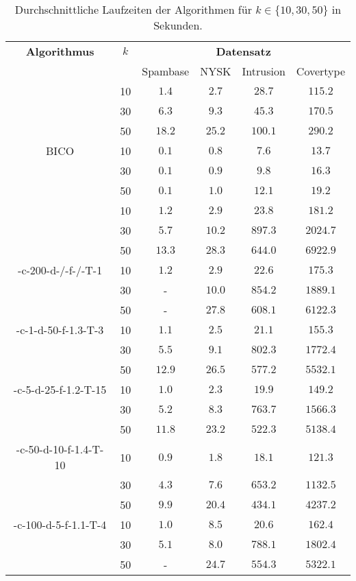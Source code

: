 \begin{table}[h]
\centering
\begin{tabular}{@{}cccccc@{}} \toprule
	\textbf{Algorithmus} & $k$ & \multicolumn{4}{c}{\textbf{Datensatz}} \\
	\cmidrule(r){3-6} & 		& Spambase 				& NYSK 				& Intrusion 			& Covertype \\ \toprule
	\Skmpp 						& 10 & $1.4$ 			& $2.7$ 			& $28.7$ 				& $115.2$ \\
		 						& 30 & $6.3$ 			& $9.3$ 			& $45.3$ 				& $170.5$ \\
		 						& 50 & $18.2$ 			& $25.2$ 			& $100.1$ 				& $290.2$ \\
	\midrule
	BICO 						& 10 & $0.1$ 			& $0.8$ 			& $7.6$ 				& $13.7$ \\
			 					& 30 & $0.1$ 			& $0.9$ 			& $9.8$ 				& $16.3$ \\
		 						& 50 & $0.1$ 			& $1.0$ 			& $12.1$ 				& $19.2$ \\
	\midrule
	\kmpp 						& 10 & $1.2$ 			& $2.9$ 			& $23.8$ 				& $181.2$ \\
			 					& 30 & $5.7$ 			& $10.2$ 			& $897.3$ 				& $2024.7$ \\
		 						& 50 & $13.3$ 			& $28.3$ 			& $644.0$ 				& $6922.9$ \\
	\midrule
	\KCsTwo-c-200-d-/-f-/-T-1	& 10 & $1.2$			& $2.9$				& $22.6$ 				& $175.3$ \\
			 					& 30 & - 				& $10.0$			& $854.2$ 				& $1889.1$ \\
		 						& 50 & - 				& $27.8$			& $608.1$ 				& $6122.3$ \\
	\midrule
	\KCsTwo-c-1-d-50-f-1.3-T-3	& 10 & $1.1$ 			& $2.5$ 			& $21.1$ 				& $155.3$ \\
			 					& 30 & $5.5$ 			& $9.1$ 			& $802.3$ 				& $1772.4$ \\
		 						& 50 & $12.9$ 			& $26.5$ 			& $577.2$ 				& $5532.1$ \\
	\midrule
	\KCsTwo-c-5-d-25-f-1.2-T-15	& 10 & $1.0$ 			& $2.3$ 			& $19.9$ 				& $149.2$ \\
			 					& 30 & $5.2$ 			& $8.3$ 			& $763.7$ 				& $1566.3$ \\
		 						& 50 & $11.8$ 			& $23.2$ 			& $522.3$ 				& $5138.4$ \\
	\midrule
	\KCsTwo-c-50-d-10-f-1.4-T-10& 10 & $0.9$ 			& $1.8$ 			& $18.1$ 				& $121.3$ \\
			 					& 30 & $4.3$ 			& $7.6$ 			& $653.2$ 				& $1132.5$ \\
		 						& 50 & $9.9$ 			& $20.4$ 			& $434.1$ 				& $4237.2$ \\
	\midrule
	\KCsTwo-c-100-d-5-f-1.1-T-4	& 10 & $1.0$ 			& $8.5$ 			& $20.6$ 				& $162.4$ \\
			 					& 30 & $5.1$ 			& $8.0$				& $788.1$ 				& $1802.4$ \\
		 						& 50 & - 				& $24.7$ 			& $554.3$ 				& $5322.1$ \\
	\bottomrule
\end{tabular}
\caption{Durchschnittliche Laufzeiten der Algorithmen für $k \in \{ 10, 30, 50 \}$ in Sekunden.}
\label{tbl:experiment-coresets-kernel-runtime}
\end{table}